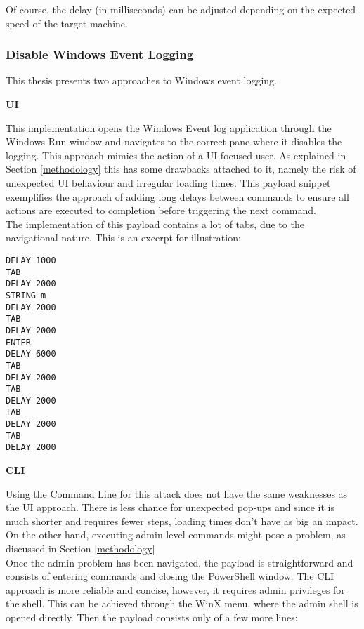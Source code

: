 Of course, the delay (in milliseconds) can be adjusted depending on the expected speed of the target machine. 





\subsubsection{Disable Windows Event Logging}

This thesis presents two approaches to Windows event logging.

\textbf{UI} 

This implementation opens the Windows Event log application through the Windows Run window and navigates to the correct pane where it disables the logging.
This approach mimics the action of a UI-focused user. As explained in Section \ref{methodology} this has some drawbacks attached to it, namely the risk of unexpected UI behaviour and irregular loading times. This payload snippet exemplifies the approach of adding long delays between commands to ensure all actions are executed to completion before triggering the next command.\\
The implementation of this payload contains a lot of tabs, due to the navigational nature. This is an excerpt for illustration:

\begin{lstlisting}[caption={Exceprt: disable Windows Event Logging by navigating UI}, captionpos=b]
DELAY 1000
TAB
DELAY 2000
STRING m
DELAY 2000
TAB
DELAY 2000
ENTER
DELAY 6000
TAB
DELAY 2000
TAB
DELAY 2000
TAB
DELAY 2000
TAB
DELAY 2000
\end{lstlisting}

\textbf{CLI}

Using the Command Line for this attack does not have the same weaknesses as the UI approach. There is less chance for unexpected pop-ups and since it is much shorter and requires fewer steps, loading times don't have as big an impact. On the other hand, executing admin-level commands might pose a problem, as discussed in Section \ref{methodology} \\

Once the admin problem has been navigated, the payload is straightforward and consists of entering commands and closing the PowerShell window.
The CLI approach is more reliable and concise, however, it requires admin privileges for the shell. This can be achieved through the WinX menu, where the admin shell is opened directly. Then the payload consists only of a few more lines:

